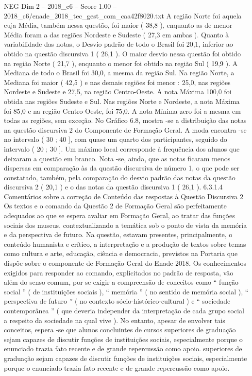 \begin{textsample}{NEG Dim 2 – 2018\_c6 – Score 1.00 – 2018\_c6/enade\_2018\_tec\_gest\_com\_caa42f8020.txt}
A região Norte foi aquela cuja Média, também nessa questão, foi maior ( 38,8 ), enquanto as de menor Média foram a das regiões Nordeste e Sudeste ( 27,3 em ambas ).
Quanto à variabilidade das notas, o Desvio padrão de todo o Brasil foi 20,1, inferior ao obtido na questão discursiva 1 ( 26,1 ).
O maior desvio nessa questão foi obtido na região Norte ( 21,7 ), enquanto o menor foi obtido na região Sul ( 19,9 ).
A Mediana de todo o Brasil foi 30,0, a mesma da região Sul.
Na região Norte, a Mediana foi maior ( 42,5 ) e nas demais regiões foi menor : 25,0, nas regiões Nordeste e Sudeste e 27,5, na região Centro-Oeste.
A nota Máxima 100,0 foi obtida nas regiões Sudeste e Sul.
Nas regiões Norte e Nordeste, a nota Máxima foi 85,0 e na região Centro-Oeste, foi 75,0.
A nota Mínima zero foi a mesma em todas as regiões, sem exceção.
No Gráfico 6.8, mostra -se a distribuição das notas na questão discursiva 2 do Componente de Formação Geral.
A moda encontra -se no intervalo ( 30 ; 40 ], com quase um quarto dos participantes, seguido do intervalo ( 20 ; 30 ].
Um máximo local corresponde à frequência dos alunos que deixaram a questão em branco.
Nota -se, ainda, que as notas ficaram menos dispersas em comparação às da questão discursiva de número 1, o que pode ser constatado, também, pela comparação do desvio padrão das notas da questão discursiva 2 ( 20,1 ) e o das notas da questão discursiva 1 ( 26,1 ). 6.3.1.4 Comentários sobre a correção de Conteúdo das respostas à Questão Discursiva 2 Os textos e o comando da Questão 2 de Formação Geral são perfeitamente adequados ao que se espera avaliar em Formação Geral, ao tratar das funções sociais dos museus, contextualizando a temática sob o ponto de vista da memória e da perspectiva de futuro.
Na questão, estavam presentes, principalmente, o conteúdo humanista e crítico, a interpretação e a produção de textos sobre temas como cultura e arte, educação, ciência e democracia, previstos na Portaria que dispõe sobre o componente de Formação Geral do Enade 2018.
Os conhecimentos exigidos para responder ao comando, explicitados no padrão de resposta, vão além do senso comum, por se exigir a compreensão de conceitos como “ função social ” ( de instituições sociais ), “ memória ” ( no sentido de memória social ), “ perspectiva de futuro ” ( no contexto sócio-histórico-cultural ) e “ sociedade contemporânea ” ( que deveria independer da interpretação de cada grupo social a respeito da sociedade na qual vive ).
No entanto, apesar de envolver tais conceitos, espera -se que alunos concluintes de cursos superiores de graduação sejam capazes de discutir funções de instituições sociais, especialmente porque o enunciado trazia fato recente e de grande repercussão como apoio. superiores de graduação sejam capazes de discutir funções de instituições sociais, especialmente porque o enunciado trazia fato recente e de grande repercussão como apoio.

\end{textsample}
